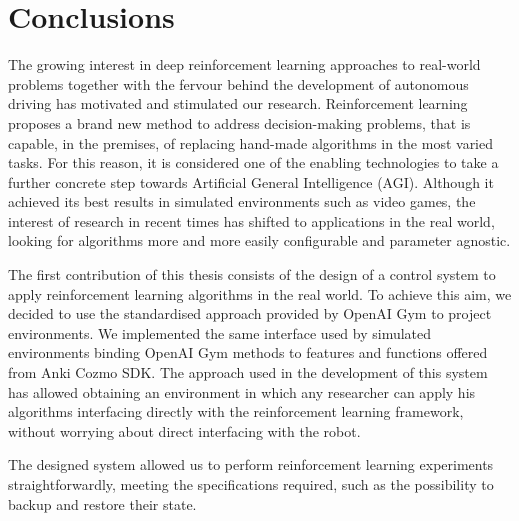 \chapter{Conclusions} \label{ch:ch6}

The growing interest in deep reinforcement learning approaches to real-world problems together with the fervour behind the development of autonomous driving has motivated and stimulated our research.
Reinforcement learning proposes a brand new method to address decision-making problems, that is capable, in the premises, of replacing hand-made algorithms in the most varied tasks.
For this reason, it is considered one of the enabling technologies to take a further concrete step towards Artificial General Intelligence (AGI).
Although it achieved its best results in simulated environments such as video games, the interest of research in recent times has shifted to applications in the real world, looking for algorithms more and more easily configurable and parameter agnostic.

The first contribution of this thesis consists of the design of a control system to apply reinforcement learning algorithms in the real world.
To achieve this aim, we decided to use the standardised approach provided by OpenAI Gym to project environments.
We implemented the same interface used by simulated environments binding OpenAI Gym methods to features and functions offered from Anki Cozmo SDK.
The approach used in the development of this system has allowed obtaining an environment in which any researcher can apply his algorithms interfacing directly with the reinforcement learning framework, without worrying about direct interfacing with the robot.

The designed system allowed us to perform reinforcement learning experiments straightforwardly, meeting the specifications required, such as the possibility to backup and restore their state.

